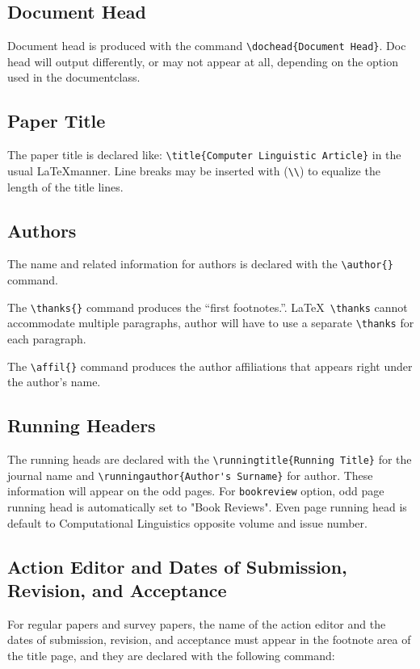 \documentclass{clv3}
\begin{document}
\subsection{Document Head}

Document head is produced with the command \verb|\dochead{Document Head}|. Doc head 
will output differently, or may not appear at all, depending on the option used in the 
documentclass.

\subsection{Paper Title}

The paper title is declared like: \verb|\title{Computer Linguistic Article}|
in the usual \LaTeX manner. Line breaks may be inserted with (\verb|\\|) to equalize 
the length of the title lines.

\subsection{Authors}
The name and related information for authors is declared with the \verb|\author{}| command. 

The \verb|\thanks{}| command produces the ``first footnotes.''. \LaTeX\ \verb|\thanks| 
cannot accommodate multiple paragraphs, author will have to use a separate \verb|\thanks|
for each paragraph.

The \verb|\affil{}| command produces the author affiliations that appears right under 
the author's name.

\subsection{Running Headers}
The running heads are declared with the \verb|\runningtitle{Running Title}| for the 
journal name and \verb|\runningauthor{Author's Surname}| for author. These information 
will appear on the odd pages. For {\tt bookreview} option, odd page running head is 
automatically set to "Book Reviews". Even page running head is default to Computational 
Linguistics opposite volume and issue number.

\subsection{Action Editor and Dates of Submission, Revision, and Acceptance}

For regular papers and survey papers, the name of the action editor and the dates of submission, revision, and acceptance must appear in the footnote area of the title page, and they are declared with the following command:
\end{document}

